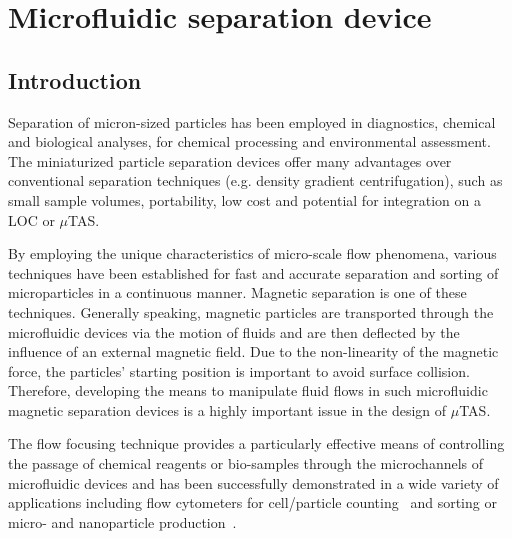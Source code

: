 \chapter{Microfluidic separation device}\label{ch:fluidMechanics}


\section{Introduction}\label{sec:introductionFluidMechanics}
Separation of micron-sized particles has been employed in diagnostics, chemical and biological analyses, for chemical processing and environmental assessment. The miniaturized particle separation devices offer many advantages over conventional separation techniques (e.g. density gradient centrifugation), such as small sample volumes, portability, low cost and potential for integration on a LOC or $\mu$TAS.

By employing the unique characteristics of micro-scale flow phenomena, various techniques have been established for fast and accurate separation and sorting of microparticles in a continuous manner. Magnetic separation is one of these techniques. Generally speaking, magnetic particles are transported through the microfluidic devices via the motion of fluids and are then deflected by the influence of an external magnetic field. Due to the non-linearity of the magnetic force, the particles' starting position is important to avoid surface collision. Therefore, developing the means to manipulate fluid flows in such microfluidic magnetic separation devices is a highly important issue in the design of $\mu$TAS. 

The flow focusing technique provides a particularly effective means of controlling the passage of chemical reagents or bio-samples through the microchannels of microfluidic devices and has been successfully demonstrated in a wide variety of applications including flow cytometers for cell/particle counting~\cite{Shapiro2005} and sorting or micro- and nanoparticle production~\cite{Xu2004,Kim2007,Whitesides2006}. 

